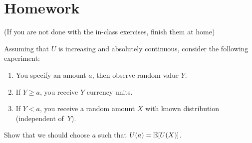\documentclass[twoside,a4paper]{article}
\begin{document}
\section{Homework}
(If you are not done with the in-class exercises, finish them at home)

\begin{exercise}
  Assuming that $U$ is increasing and absolutely continuous, consider the following experiment:
  \begin{enumerate}
  \item You specify an amount $a$, then observe random value $Y$.
  \item If $Y \geq a$, you receive $Y$ currency units.
  \item If $Y < a$, you receive a random amount $X$ with known distribution (independent of~$Y$).
  \end{enumerate}
  Show that we should choose $a$ such that $U(a) = \mathop{\mbox{\ensuremath{\mathbb{E}}}}\nolimits[U(X)]$.
\end{exercise}
\end{document}
